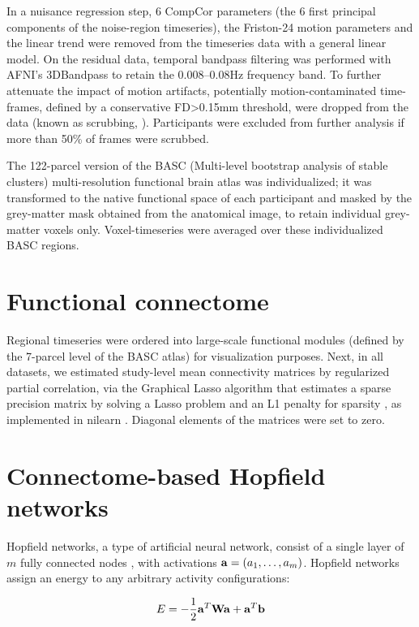 \documentclass{article}
\begin{document}
In a nuisance regression step, 6 CompCor parameters (the 6 first principal components of the noise-region timeseries), the Friston-24 motion parameters and the linear trend were removed from the timeseries data with a general linear model. On the residual data, temporal bandpass filtering was performed with AFNI's 3DBandpass to retain the 0.008--0.08Hz frequency band. To further attenuate the impact of motion artifacts, potentially motion-contaminated time-frames, defined by a conservative FD\textgreater 0.15mm threshold, were dropped from the data (known as scrubbing, \cite{satterthwaite2013improved}). Participants were excluded from further analysis if more than 50\% of frames were scrubbed.

The 122-parcel version of the BASC (Multi-level bootstrap analysis of stable clusters) multi-resolution functional brain atlas \citep{bellec2010multi} was individualized; it was transformed to the native functional space of each participant and masked by the  grey-matter mask obtained from the anatomical image, to retain individual grey-matter voxels only. Voxel-timeseries were averaged over these individualized BASC regions.

\section{Functional connectome}

Regional timeseries were ordered into large-scale functional modules (defined by the 7-parcel level of the BASC atlas) for visualization purposes.
Next, in all datasets, we estimated study-level mean connectivity matrices by regularized partial correlation, via the Graphical Lasso algorithm that estimates a sparse precision matrix by solving a Lasso problem and an L1 penalty for sparsity \citep{varoquaux2010detection}, as implemented in nilearn \citep{abraham2014machine}.  Diagonal elements of the matrices were set to zero.

\section{Connectome-based Hopfield networks}

Hopfield networks, a type of artificial neural network, consist of a single layer of $m$ fully connected nodes \citep{hopfield1982neural}, with activations $\bold{a} = (a_1, \dots, a_m )$. Hopfield networks assign an energy to any arbitrary activity configurations:

\begin{equation}
\label{energy-function}
E = - \frac{1}{2}  \bold{a}^{T} \bold{W} \bold{a} + \bold{a}^{T}\bold{b}
\end{equation}
\end{document}

